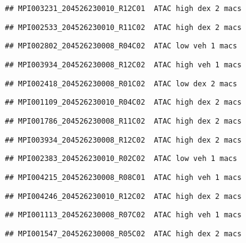 \documentclass[
]{article}
\begin{document}
\begin{verbatim}
## MPI003231_204526230010_R12C01  ATAC high dex 2 macs
\end{verbatim}

\begin{verbatim}
## MPI002533_204526230010_R11C02  ATAC high dex 2 macs
\end{verbatim}

\begin{verbatim}
## MPI002802_204526230008_R04C02  ATAC low veh 1 macs
\end{verbatim}

\begin{verbatim}
## MPI003934_204526230008_R12C02  ATAC high veh 1 macs
\end{verbatim}

\begin{verbatim}
## MPI002418_204526230008_R01C02  ATAC low dex 2 macs
\end{verbatim}

\begin{verbatim}
## MPI001109_204526230010_R04C02  ATAC high dex 2 macs
\end{verbatim}

\begin{verbatim}
## MPI001786_204526230008_R11C02  ATAC high dex 2 macs
\end{verbatim}

\begin{verbatim}
## MPI003934_204526230008_R12C02  ATAC high dex 2 macs
\end{verbatim}

\begin{verbatim}
## MPI002383_204526230010_R02C02  ATAC low veh 1 macs
\end{verbatim}

\begin{verbatim}
## MPI004215_204526230008_R08C01  ATAC high veh 1 macs
\end{verbatim}

\begin{verbatim}
## MPI004246_204526230010_R12C02  ATAC high dex 2 macs
\end{verbatim}

\begin{verbatim}
## MPI001113_204526230008_R07C02  ATAC high veh 1 macs
\end{verbatim}

\begin{verbatim}
## MPI001547_204526230008_R05C02  ATAC high dex 2 macs
\end{verbatim}
\end{document}

